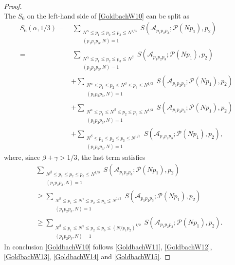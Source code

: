 \documentclass[12pt, a4paper]{amsart}
\def\le{\leqslant}
\def\ge{\geqslant}
\theoremstyle{plain}
\theoremstyle{remark}
\numberwithin{equation}{section}
\begin{document}
\begin{proof}
\begin{equation}
\end{equation}
The $S_6$ on the left-hand side of \eqref{GoldbachW10} can be split as 
\begin{equation}\label{GoldbachW14}
\begin{split}
S_6(\alpha, 1/3) 
=&\ \sum_{\substack{N^\alpha \le p_1 \le p_2 \le p_3 \le N^{1/3} \\ (p_1 p_2 p_3, N) = 1}} S(\mathscr{A}_{p_1 p_2 p_3}; \mathscr{P}(N p_1), p_2)\\
		=&\ \sum_{\substack{N^\alpha \le p_1 \le p_2 \le p_3\le N^\beta \\ (p_1 p_2 p_3, N) = 1}}  S(\mathscr{A}_{p_1 p_2 p_3}; \mathscr{P}(Np_1), p_2)\\
		&+\sum_{\substack{N^\alpha \le p_1 \le p_2\le N^\beta \le p_3\le N^{1/3} \\ (p_1 p_2 p_3, N) = 1}}  S(\mathscr{A}_{p_1 p_2 p_3}; \mathscr{P}(Np_1), p_2)\\
		&+\sum_{\substack{N^\alpha \le p_1 \le N^\beta\le p_2\le p_3\le N^{1/3} \\ (p_1 p_2 p_3, N) = 1}}  S(\mathscr{A}_{p_1 p_2 p_3}; \mathscr{P}(Np_1), p_2)\\
		&+\sum_{\substack{N^\beta \le p_1 \le p_2\le p_3\le N^{1/3} \\ (p_1 p_2 p_3, N) = 1}}  S(\mathscr{A}_{p_1 p_2 p_3}; \mathscr{P}(Np_1), p_2),
\end{split}
\end{equation}
where, since $\beta+\gamma>1/3$, the last term satisfies 
\begin{equation}\label{GoldbachW15}
		\begin{split}
		& \sum_{\substack{N^\beta \le p_1 \le p_2\le p_3\le N^{1/3} \\ (p_1 p_2 p_3, N) = 1}}  S(\mathscr{A}_{p_1 p_2 p_3}; \mathscr{P}(Np_1), p_2)\\
		& \ge \sum_{\substack{N^\beta \le p_1\le N^\gamma \le p_2\le p_3\le N^{1/3} \\ (p_1 p_2 p_3, N) = 1}}  S(\mathscr{A}_{p_1 p_2 p_3}; \mathscr{P}(Np_1), p_2)\\
		& \ge \sum_{\substack{N^\beta \le p_1\le N^\gamma \le p_2\le p_3\le (N/p_1p_2)^{1/2} \\ (p_1 p_2 p_3, N) = 1}}  S(\mathscr{A}_{p_1 p_2 p_3}; \mathscr{P}(Np_1), p_2). 
\end{split}
\end{equation}
In conclusion \eqref{GoldbachW10} follows \eqref{GoldbachW11}, \eqref{GoldbachW12}, \eqref{GoldbachW13}, \eqref{GoldbachW14} and \eqref{GoldbachW15}.
\end{proof}
	
\end{document}
